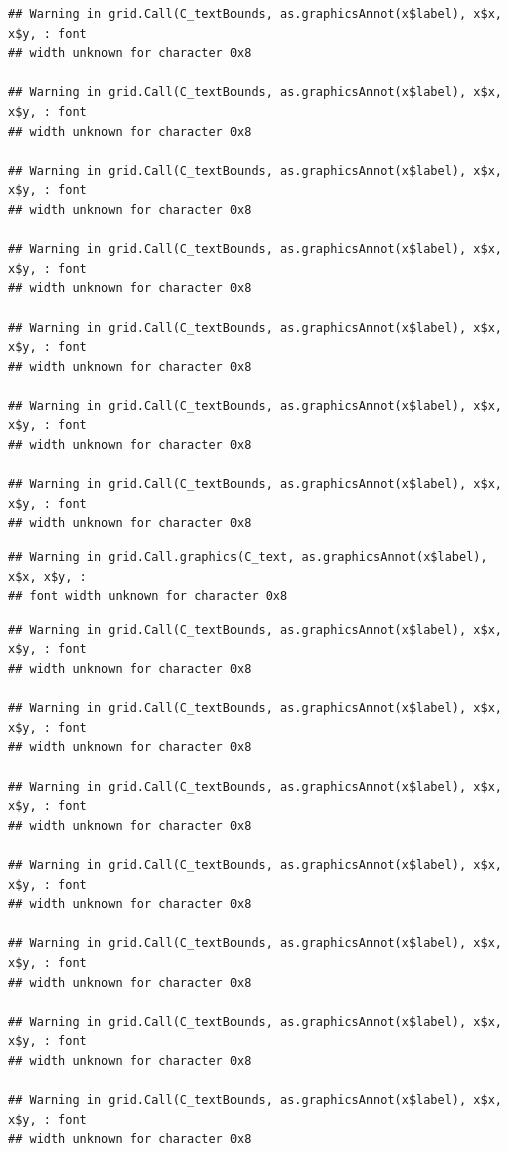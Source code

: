 \documentclass[
]{article}
\begin{document}
\begin{verbatim}
## Warning in grid.Call(C_textBounds, as.graphicsAnnot(x$label), x$x, x$y, : font
## width unknown for character 0x8

## Warning in grid.Call(C_textBounds, as.graphicsAnnot(x$label), x$x, x$y, : font
## width unknown for character 0x8

## Warning in grid.Call(C_textBounds, as.graphicsAnnot(x$label), x$x, x$y, : font
## width unknown for character 0x8

## Warning in grid.Call(C_textBounds, as.graphicsAnnot(x$label), x$x, x$y, : font
## width unknown for character 0x8

## Warning in grid.Call(C_textBounds, as.graphicsAnnot(x$label), x$x, x$y, : font
## width unknown for character 0x8

## Warning in grid.Call(C_textBounds, as.graphicsAnnot(x$label), x$x, x$y, : font
## width unknown for character 0x8

## Warning in grid.Call(C_textBounds, as.graphicsAnnot(x$label), x$x, x$y, : font
## width unknown for character 0x8
\end{verbatim}

\begin{verbatim}
## Warning in grid.Call.graphics(C_text, as.graphicsAnnot(x$label), x$x, x$y, :
## font width unknown for character 0x8
\end{verbatim}

\begin{verbatim}
## Warning in grid.Call(C_textBounds, as.graphicsAnnot(x$label), x$x, x$y, : font
## width unknown for character 0x8

## Warning in grid.Call(C_textBounds, as.graphicsAnnot(x$label), x$x, x$y, : font
## width unknown for character 0x8

## Warning in grid.Call(C_textBounds, as.graphicsAnnot(x$label), x$x, x$y, : font
## width unknown for character 0x8

## Warning in grid.Call(C_textBounds, as.graphicsAnnot(x$label), x$x, x$y, : font
## width unknown for character 0x8

## Warning in grid.Call(C_textBounds, as.graphicsAnnot(x$label), x$x, x$y, : font
## width unknown for character 0x8

## Warning in grid.Call(C_textBounds, as.graphicsAnnot(x$label), x$x, x$y, : font
## width unknown for character 0x8

## Warning in grid.Call(C_textBounds, as.graphicsAnnot(x$label), x$x, x$y, : font
## width unknown for character 0x8
\end{verbatim}
\end{document}
